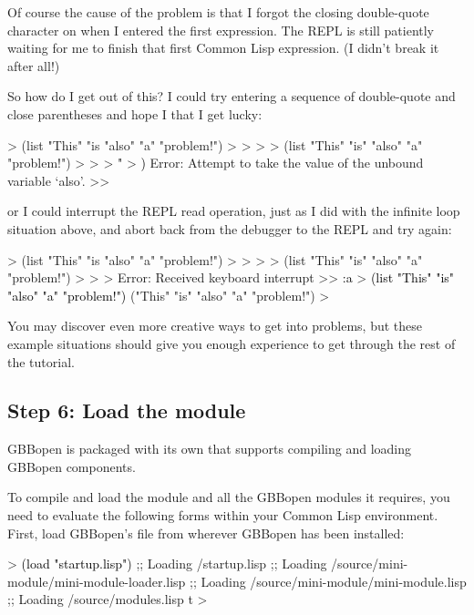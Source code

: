 \documentclass[10pt,twoside,english,pdftex]{article}
\begin{document}
Of course the cause of the problem is that I forgot the closing double-quote
character on  when I entered the first expression.  The REPL is
still patiently waiting for me to finish that first Common Lisp expression.
(I didn't break it after all!)

So how do I get out of this?  I could try entering a sequence of double-quote
and close parentheses and hope I that I get lucky:
%
\begin{example}\color{darkergray}%
  > (list "This" "is "also" "a" "problem!")
  >
  >
  >
  > (list "This" "is" "also" "a" "problem!")
  >
  >
  > \textcolor{black}{"}
  > \textcolor{black}{)}
  Error: Attempt to take the value of the unbound variable `also'.
  >>
\end{example}
%
or I could interrupt the REPL read operation, just as I did with the infinite
loop situation above, and abort back from the debugger to the REPL and try
again:
%
\begin{example}\color{darkergray}%
  > (list "This" "is "also" "a" "problem!")
  >
  >
  >
  > (list "This" "is" "also" "a" "problem!")
  >
  >
  > \textcolor{black}{}
  Error: Received keyboard interrupt 
  >> \textcolor{black}{:a}
  > \textcolor{black}{(list "This" "is" "also" "a" "problem!")}
  ("This" "is" "also" "a" "problem!")
  >
\end{example}

You may discover even more creative ways to get into problems, but these
example situations should give you enough experience to get through the rest
of the tutorial.

\subsection*{Step 6: Load the  module}

%
GBBopen is packaged with its own 
that supports compiling and loading GBBopen components.

To compile and load the  module and all the GBBopen
modules it requires, you need to evaluate the following forms within your
Common Lisp environment.  First, load GBBopen's  file from
wherever GBBopen has been installed:
%
\begin{example}\color{darkergray}%
  > \textcolor{black}{(load "startup.lisp")}
  ;; Loading /startup.lisp
  ;;  Loading /source/mini-module/mini-module-loader.lisp
  ;;   Loading /source/mini-module/mini-module.lisp
  ;;  Loading /source/modules.lisp
  t
  >
\end{example}
\end{document}
